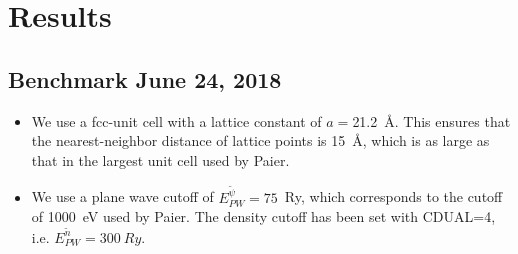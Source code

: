 \documentclass{book}
\begin{document}
\newpage
\section*{Results}
\subsection*{Benchmark June 24, 2018}
\begin{itemize}
\item We use a fcc-unit cell with a lattice constant of $a=$21.2~{\AA}. This
ensures that the nearest-neighbor distance of lattice points is
15~\AA, which is as large as that in the largest unit cell used by
Paier\cite{paier05_jcp122_234102}.
%
\item We use a plane wave cutoff of $E_{PW}^{\tilde{\psi}}=75$~Ry, which
corresponds to the cutoff of 1000~eV used by
Paier\cite{paier05_jcp122_234102}.
The density cutoff has been set with CDUAL=4,
i.e. $E_{PW}^{\tilde{n}}=300~Ry$.


\end{itemize}
\end{document}
